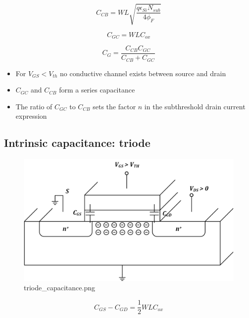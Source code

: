 \documentclass[11pt]{article}
\providecommand{\tightlist}{%
      \setlength{\itemsep}{0pt}\setlength{\parskip}{0pt}}
\begin{document}
    \begin{equation}
C_{CB} = WL \sqrt{\dfrac{q\epsilon_{Si}N_{sub}}{4 \phi_F}}
\end{equation}

\begin{equation}
C_{GC} = WLC_{ox}
\end{equation}

\begin{equation}
\boxed{C_G = \dfrac{C_{CB}C_{GC}}{C_{CB}+C_{GC}}}
\end{equation}

    \begin{itemize}
\tightlist
\item
  For \(V_{GS} < V_{th}\) no conductive channel exists between source
  and drain
\item
  \(C_{GC}\) and \(C_{CB}\) form a series capacitance
\item
  The ratio of \(C_{GC}\) to \(C_{CB}\) sets the factor \(n\) in the
  subthreshold drain current expression
\end{itemize}

    \hypertarget{intrinsic-capacitance-triode}{%
\subsection{Intrinsic capacitance:
triode}\label{intrinsic-capacitance-triode}}

    \begin{figure}
\centering
\includegraphics{triode_capacitance.png}
\caption{triode\_capacitance.png}
\end{figure}

    \begin{equation}
C_{GS} - C_{GD} = \dfrac{1}{2}WLC_{ox}
\end{equation}
\end{document}
